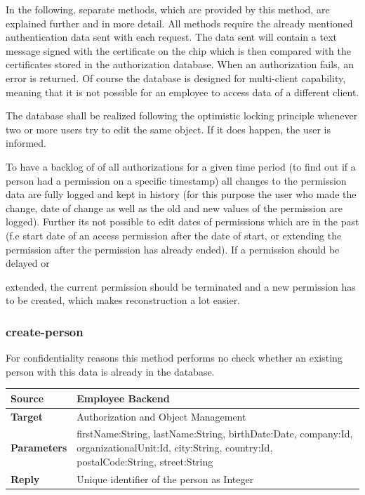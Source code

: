 \documentclass[12pt,a4paper,titlepage,oneside]{scrartcl}
\begin{document}
In the following, separate methods, which are provided by this method, are explained further and in more detail. All methods require the already mentioned authentication data sent with each request. The data sent will contain a text message signed with the certificate on the chip which is then compared with the certificates stored in the authorization database. When an authorization fails, an error is returned. Of course the database is designed for multi-client capability, meaning that it is not possible for an employee to access data of a different client.

The database shall be realized following the optimistic locking principle whenever two or more users try to edit the same object. If it does happen, the user is informed.

To have a backlog of of all authorizations for a given time period (to find out if a person had a permission on a specific timestamp) all changes to the permission data are fully logged and kept in history (for this purpose the user who made the change, date of change as well as the old and new values of the permission are logged). Further its not possible to edit dates of permissions which are in the past (f.e start date of an access permission after the date of start, or extending the permission after the permission has already ended). If a permission should be delayed or

extended, the current permission should be terminated and a new permission has to be created, which makes reconstruction a lot easier.

\subsubsection{create-person}
For confidentiality reasons this method performs no check whether an existing person with this data is already in the database.

\begin{table}[h]
    \centering
    \begin{tabular}{|l|p{12cm}|} \hline
    \textbf{Source}&Employee Backend\\ \hline
    \textbf{Target}&Authorization and Object Management\\ \hline
    \textbf{Parameters}&firstName:String, lastName:String, birthDate:Date, company:Id, organizationalUnit:Id, city:String, country:Id, postalCode:String, street:String\\ \hline
    \textbf{Reply}&Unique identifier of the person as Integer\\ \hline
    \end{tabular}
\end{table}
\end{document}
